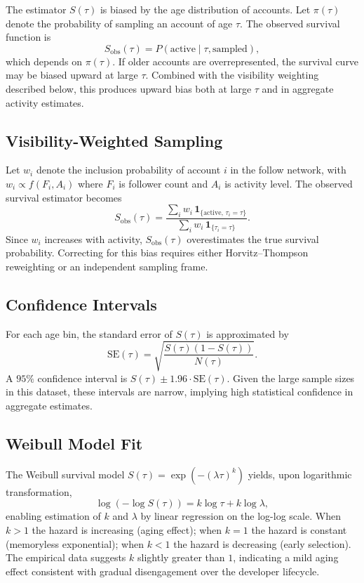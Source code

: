 \documentclass[12pt,a4paper]{article}
\begin{document}
The estimator $S(\tau)$ is biased by the age distribution of accounts. Let $\pi(\tau)$ denote the probability of sampling an account of age $\tau$. The observed survival function is
\[
S_{\text{obs}}(\tau) = P(\text{active} \mid \tau, \text{sampled}),
\]
which depends on $\pi(\tau)$. If older accounts are overrepresented, the survival curve may be biased upward at large $\tau$. Combined with the visibility weighting described below, this produces upward bias both at large $\tau$ and in aggregate activity estimates.

\subsection{Visibility-Weighted Sampling}

Let $w_i$ denote the inclusion probability of account $i$ in the follow network, with $w_i \propto f(F_i, A_i)$ where $F_i$ is follower count and $A_i$ is activity level. The observed survival estimator becomes
\[
S_{\text{obs}}(\tau) = \frac{\sum_i w_i \,\mathbf{1}_{\{\text{active},\, \tau_i = \tau\}}}{\sum_i w_i \,\mathbf{1}_{\{\tau_i = \tau\}}}.
\]
Since $w_i$ increases with activity, $S_{\text{obs}}(\tau)$ overestimates the true survival probability. Correcting for this bias requires either Horvitz--Thompson reweighting or an independent sampling frame.

\subsection{Confidence Intervals}

For each age bin, the standard error of $S(\tau)$ is approximated by
\[
\mathrm{SE}(\tau) = \sqrt{\frac{S(\tau)(1 - S(\tau))}{N(\tau)}}.
\]
A $95\%$ confidence interval is $S(\tau) \pm 1.96 \cdot \mathrm{SE}(\tau)$. Given the large sample sizes in this dataset, these intervals are narrow, implying high statistical confidence in aggregate estimates.

\subsection{Weibull Model Fit}

The Weibull survival model $S(\tau) = \exp(-(\lambda \tau)^k)$ yields, upon logarithmic transformation,
\[
\log(-\log S(\tau)) = k \log \tau + k \log \lambda,
\]
enabling estimation of $k$ and $\lambda$ by linear regression on the log-log scale. When $k > 1$ the hazard is increasing (aging effect); when $k = 1$ the hazard is constant (memoryless exponential); when $k < 1$ the hazard is decreasing (early selection). The empirical data suggests $k$ slightly greater than $1$, indicating a mild aging effect consistent with gradual disengagement over the developer lifecycle.
\end{document}
